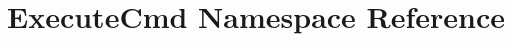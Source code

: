 \hypertarget{namespaceExecuteCmd}{\section{Execute\-Cmd Namespace Reference}
\label{namespaceExecuteCmd}
}

